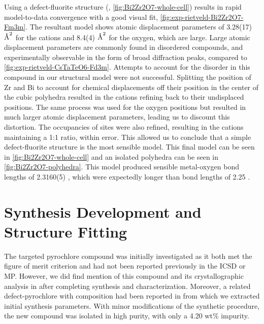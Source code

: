 \documentclass{article}
\newcommand{\CsTaTeO}[1][]{\ch{CsTaTeO6#1}}
\newcommand{\A}{\protect\text{Å}} %
\begin{document}
Using a defect-fluorite structure (, \cref{fig:Bi2Zr2O7-whole-cell}) results in rapid model-to-data convergence with a good visual fit, \cref{fig:exp-rietveld-Bi2Zr2O7-Fm3m}.
The resultant model shows atomic displacement parameters of 3.28(17) $\A^2$ for the cations and 8.4(4) $\A^2$ for the oxygen, which are large.
Large atomic displacement parameters are commonly found in disordered compounds, and experimentally observable in the form of broad diffraction peaks, compared to \cref{fig:exp-rietveld-CsTaTeO6-Fd3m}.
Attempts to account for the disorder in this compound in our structural model were not successful.
Splitting the position of Zr and Bi to account for chemical displacements off their position in the center of the cubic polyhedra resulted in the cations refining back to their undisplaced positions.
The same process was used for the oxygen positions but resulted in much larger atomic displacement parameters, leading us to discount this distortion.
The occupancies of sites were also refined, resulting in the cations maintaining a 1:1 ratio, within error.
This allowed us to conclude that a simple defect-fluorite structure is the most sensible model.
This final model can be seen in \cref{fig:Bi2Zr2O7-whole-cell} and an isolated  polyhedra can be seen in \cref{fig:Bi2Zr2O7-polyhedra}.
This model produced sensible metal-oxygen bond lengths of 2.3160(5) \A, which were expectedly longer than  bond lengths of 2.25 \A.

\section{\texorpdfstring{\CsTaTeO{}}{CsTaTeO6} Synthesis Development and Structure Fitting}
\label{sec:CsTaTeO6-synthesis-development}

The targeted \CsTaTeO{} pyrochlore compound was initially investigated as it both met the figure of merit criterion and had not been reported previously in the ICSD or MP.
However, we did find mention of this compound and its crystallographic analysis in \cite{simon_synthesis_2010} after completing synthesis and characterization.
Moreover, a related defect-pyrochlore with composition  had been reported in \cite{fukina_structure_2021,weiss_photoinduced_2020} from which we extracted initial synthesis parameters.
With minor modifications of the synthetic procedure, the new compound was isolated in high purity, with only a 4.20 wt\%  impurity.
\end{document}
